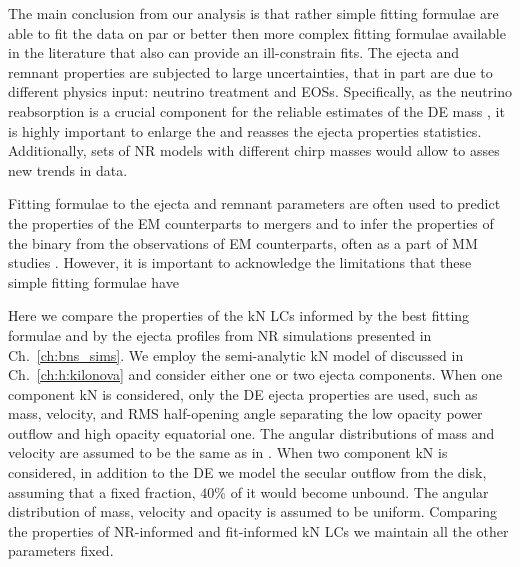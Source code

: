 The main conclusion from our analysis is that rather simple fitting formulae are able 
to fit the data on par or better then more complex fitting formulae available in the 
literature that also can provide an ill-constrain fits.
The ejecta and remnant properties are subjected to large uncertainties, that in part 
are due to different physics input: neutrino treatment and \acp{EOS}.
Specifically, as the neutrino reabsorption is a crucial component for the reliable 
estimates of the \ac{DE} mass 
\citep[\eg][]{Wanajo:2014wha,Sekiguchi:2015dma,Perego:2017wtu,Foucart:2018gis},
it is highly important to enlarge the \DSheatcool{} and reasses the ejecta properties 
statistics. 
%
Additionally, sets of \ac{NR} models with different chirp masses would allow to asses 
new trends in data.

Fitting formulae to the ejecta and remnant parameters are often used to predict the 
properties of the \ac{EM} counterparts to mergers and to infer the properties of the 
binary from the observations of \ac{EM} counterparts, often as a part of \ac{MM} studies 
\citep{Dietrich:2020efo,Breschi:2021tbm,Nicholl:2021abc}.
%
However, it is important to acknowledge the limitations that these simple 
fitting formulae have 

Here we compare the properties of the \ac{kN} \acp{LC} informed by the best fitting 
formulae and by the ejecta profiles from \ac{NR} simulations presented in 
Ch.~\ref{ch:bns_sims}. %
We employ the semi-analytic \ac{kN} model of \citet{Perego:2017wtu} discussed in 
Ch.~\ref{ch:h:kilonova} and consider either one or two ejecta components.
%
When one component \ac{kN} is considered, only the \ac{DE} ejecta properties are used, 
such as mass, velocity, and \ac{RMS} half-opening angle separating the low opacity 
power outflow and high opacity equatorial one. The angular distributions of mass and velocity 
are assumed to be the same as in \citet{Perego:2017wtu}.
When two component \ac{kN} is considered, in addition to the \ac{DE} we model the 
secular outflow from the disk, assuming that a fixed fraction, $40\%$ of it would 
become unbound. The angular distribution of mass, velocity and opacity
is assumed to be uniform. 
Comparing the properties of \ac{NR}-informed and fit-informed \ac{kN} \acp{LC} we 
maintain all the other parameters fixed.
%

